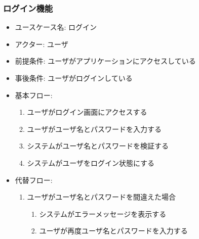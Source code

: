 \documentclass{ltjsarticle}
\begin{document}
\subsubsection{ログイン機能}
\begin{itemize}
    \item ユースケース名: ログイン
    \item アクター: ユーザ
    \item 前提条件: ユーザがアプリケーションにアクセスしている
    \item 事後条件: ユーザがログインしている
    \item 基本フロー:
    \begin{enumerate}
        \item ユーザがログイン画面にアクセスする
        \item ユーザがユーザ名とパスワードを入力する
        \item システムがユーザ名とパスワードを検証する
        \item システムがユーザをログイン状態にする
    \end{enumerate}
    \item 代替フロー:
    \begin{enumerate}
        \item ユーザがユーザ名とパスワードを間違えた場合
        \begin{enumerate}
            \item システムがエラーメッセージを表示する
            \item ユーザが再度ユーザ名とパスワードを入力する
        \end{enumerate}
    \end{enumerate}
\end{itemize}
\end{document}
